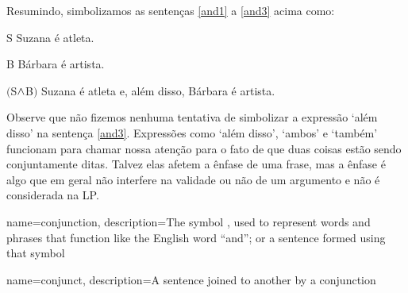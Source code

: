 Resumindo, simbolizamos as sentenças  \ref{and1} a \ref{and3} acima como:
	\begin{ekey}
		\item[S]Suzana é atleta.
		\item[B]Bárbara é artista.
		\item[$($S$\wedge$B$)$]Suzana é atleta e, além disso, Bárbara é artista.
	\end{ekey}
Observe que não fizemos nenhuma tentativa de simbolizar a expressão `além disso' na sentença \ref{and3}.
Expressões como `além disso', `ambos' e `também' funcionam para chamar nossa atenção para o fato de que duas coisas estão sendo conjuntamente ditas.
Talvez elas afetem a ênfase de uma frase, mas a ênfase é algo que em geral não interfere na validade ou não de um argumento e não é considerada na LP.

{
name=conjunction,
description={The symbol \eand, used to represent words and phrases that function like the English word ``and''; or a sentence formed using that symbol}
}

{
name=conjunct,
description={A sentence joined to another by a \gls{conjunction}}
}


